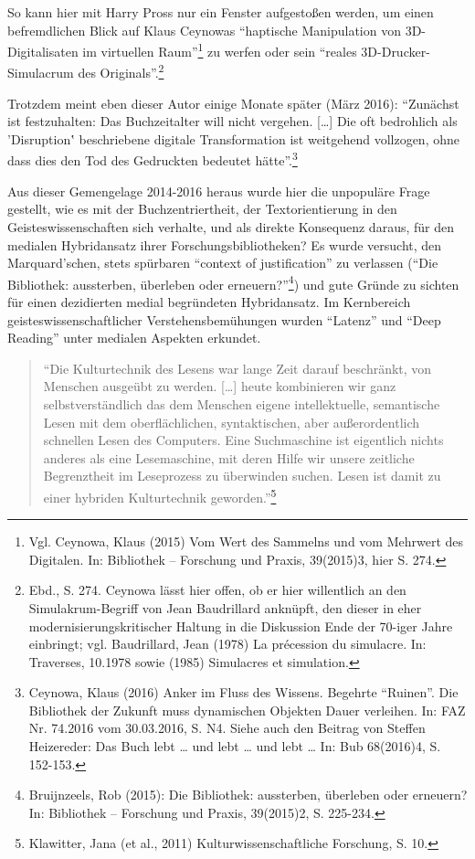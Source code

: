 \documentclass[a4paper,
fontsize=11pt,
oneside,
numbers=noperiodatend,
parskip=half-,
bibliography=totoc,
final
]{scrartcl}
\begin{document}
So kann hier mit Harry Pross nur ein Fenster aufgestoßen werden, um
einen befremdlichen Blick auf Klaus Ceynowas \enquote{haptische
Manipulation von 3D-Digitalisaten im virtuellen Raum}\footnote{Vgl.
  Ceynowa, Klaus (2015) Vom Wert des Sammelns und vom Mehrwert des
  Digitalen. In: Bibliothek -- Forschung und Praxis, 39(2015)3, hier S.
  274.} zu werfen oder sein \enquote{reales 3D-Drucker-Simulacrum des
Originals}.\footnote{Ebd., S. 274. Ceynowa lässt hier offen, ob er hier
  willentlich an den Simulakrum-Begriff von Jean Baudrillard anknüpft,
  den dieser in eher modernisierungskritischer Haltung in die Diskussion
  Ende der 70-iger Jahre einbringt; vgl. Baudrillard, Jean (1978) La
  précession du simulacre. In: Traverses, 10.1978 sowie (1985)
  Simulacres et simulation.}

Trotzdem meint eben dieser Autor einige Monate später (März 2016):
\enquote{Zunächst ist festzuhalten: Das Buchzeitalter will nicht
vergehen. {[}\ldots{}{]} Die oft bedrohlich als 'Disruption‛
beschriebene digitale Transformation ist weitgehend vollzogen, ohne dass
dies den Tod des Gedruckten bedeutet hätte}.\footnote{Ceynowa, Klaus
  (2016) Anker im Fluss des Wissens. Begehrte \enquote{Ruinen}. Die
  Bibliothek der Zukunft muss dynamischen Objekten Dauer verleihen. In:
  FAZ Nr. 74.2016 vom 30.03.2016, S. N4. Siehe auch den Beitrag von
  Steffen Heizereder: Das Buch lebt \ldots{} und lebt \ldots{} und lebt
  \ldots{} In: Bub 68(2016)4, S. 152-153.}

Aus dieser Gemengelage 2014-2016 heraus wurde hier die unpopuläre Frage
gestellt, wie es mit der Buchzentriertheit, der Textorientierung in den
Geisteswissenschaften sich verhalte, und als direkte Konsequenz daraus,
für den medialen Hybridansatz ihrer Forschungsbibliotheken? Es wurde
versucht, den Marquard'schen, stets spürbaren \enquote{context of
justification} zu verlassen (\enquote{Die Bibliothek: aussterben,
überleben oder erneuern?}\footnote{Bruijnzeels, Rob (2015): Die
  Bibliothek: aussterben, überleben oder erneuern? In: Bibliothek --
  Forschung und Praxis, 39(2015)2, S. 225-234.}) und gute Gründe zu
sichten für einen dezidierten medial begründeten Hybridansatz. Im
Kernbereich geisteswissenschaftlicher Verstehensbemühungen wurden
\enquote{Latenz} und \enquote{Deep Reading} unter medialen Aspekten
erkundet.

\begin{quote}
\enquote{Die Kulturtechnik des Lesens war lange Zeit darauf beschränkt,
von Menschen ausgeübt zu werden. {[}\ldots{}{]} heute kombinieren wir
ganz selbstverständlich das dem Menschen eigene intellektuelle,
semantische Lesen mit dem oberflächlichen, syntaktischen, aber
außerordentlich schnellen Lesen des Computers. Eine Suchmaschine ist
eigentlich nichts anderes als eine Lesemaschine, mit deren Hilfe wir
unsere zeitliche Begrenztheit im Leseprozess zu überwinden suchen. Lesen
ist damit zu einer hybriden Kulturtechnik geworden.}\footnote{Klawitter,
  Jana (et al., 2011) Kulturwissenschaftliche Forschung, S. 10.}
\end{quote}
\end{document}

